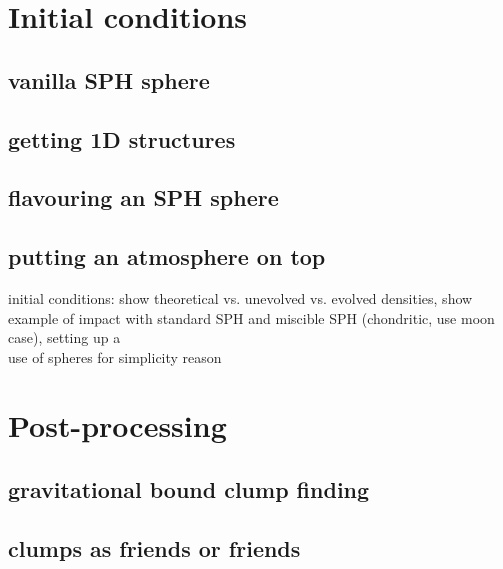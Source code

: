 \cite{amd64:2006}





\section{Initial conditions}
\subsection{vanilla SPH sphere}
\subsection{getting 1D structures}
\label{ch01_sec99}
\citep{Benz:1991p700}

\subsection{flavouring an SPH sphere}
\subsection{putting an atmosphere on top}
initial conditions: show theoretical vs. unevolved vs. evolved densities, show example of impact with standard SPH and miscible SPH (chondritic, use moon case), setting up a \SSC \\
use of spheres for simplicity reason

\section{Post-processing}
\subsection{gravitational bound clump finding}
\subsection{clumps as friends or friends}

